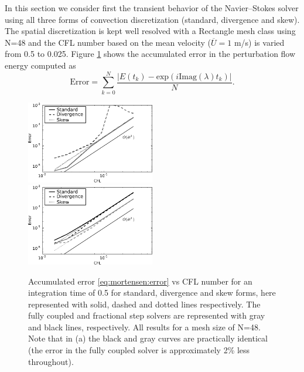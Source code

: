 In this section we consider first the transient behavior of the
Navier--Stokes solver using all three forms of convection
discretization (standard, divergence and skew). The spatial
discretization is kept well resolved with a Rectangle mesh class using
N=48 and the CFL number based on the mean velocity ($\overline{U}=1$
m/s) is varied from 0.5 to 0.025. Figure
\ref{fig:mortensen:OS_init_cfl} shows the accumulated error in the
perturbation flow energy computed as
\begin{equation}
 \text{Error} = \sum_{k=0}^N \frac{|E(t_k)-\text{exp}(i \text{Imag}(\lambda) t_k)|}{N}.
 \label{eq:mortensen:error}
\end{equation}
\begin{figure}
 \includegraphics[width=0.5\textwidth]{chapters/mortensen/pdf/OS_init_cfl_1.pdf}
 \includegraphics[width=0.5\textwidth]{chapters/mortensen/pdf/OS_init_cfl_0.pdf}
 \caption{Accumulated error \eqref{eq:mortensen:error} vs CFL number
   for an integration time of 0.5 for standard, divergence and skew
   forms, here represented with solid, dashed and dotted lines
   respectively. The fully coupled and fractional step solvers are
   represented with gray and black lines, respectively. All results
   for a mesh size of N=48. Note that in (a) the black and gray curves
   are practically identical (the error in the fully coupled solver is
   approximately 2\% less throughout). }
\label{fig:mortensen:OS_init_cfl}
\end{figure}
